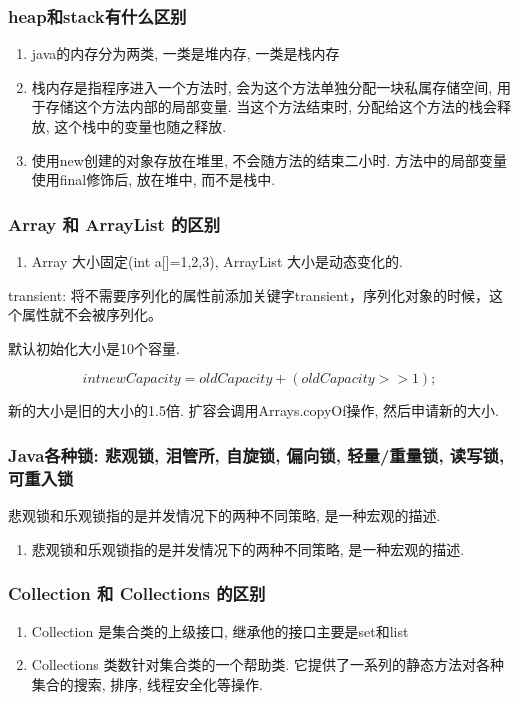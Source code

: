 \subsubsection{heap和stack有什么区别}
\begin{enumerate}
	\item java的内存分为两类, 一类是堆内存, 一类是栈内存
	\item 栈内存是指程序进入一个方法时, 会为这个方法单独分配一块私属存储空间, 用于存储这个方法内部的局部变量. 当这个方法结束时, 分配给这个方法的栈会释放, 这个栈中的变量也随之释放.
	\item 使用new创建的对象存放在堆里, 不会随方法的结束二小时. 方法中的局部变量使用final修饰后, 放在堆中, 而不是栈中.

\end{enumerate}

\subsubsection{Array 和 ArrayList 的区别}
\begin{enumerate}
	\item Array 大小固定(int a[]={1,2,3}), ArrayList 大小是动态变化的.
\end{enumerate}
transient: 将不需要序列化的属性前添加关键字transient，序列化对象的时候，这个属性就不会被序列化。

默认初始化大小是10个容量.

$$int newCapacity = oldCapacity + (oldCapacity >> 1);$$

新的大小是旧的大小的1.5倍. 扩容会调用Arrays.copyOf操作, 然后申请新的大小.
\subsubsection{Java各种锁: 悲观锁, 泪管所, 自旋锁, 偏向锁, 轻量/重量锁, 读写锁, 可重入锁}
悲观锁和乐观锁指的是并发情况下的两种不同策略, 是一种宏观的描述.
\par

\begin{enumerate}
	\item 悲观锁和乐观锁指的是并发情况下的两种不同策略, 是一种宏观的描述.

\end{enumerate}
\subsubsection{Collection 和 Collections 的区别}
\begin{enumerate}
	\item Collection 是集合类的上级接口, 继承他的接口主要是set和list
	\item Collections 类数针对集合类的一个帮助类. 它提供了一系列的静态方法对各种集合的搜索, 排序, 线程安全化等操作.
\end{enumerate}

